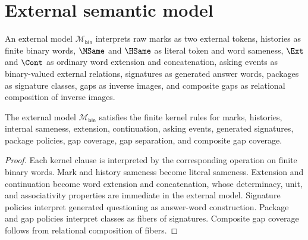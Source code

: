 \section{External semantic model}

\begin{definition}
\label{def:binary-external-model}
An external model \(\mathcal M_{\mathsf{bin}}\) interprets raw marks as two external tokens, histories as finite binary words, \(\MSame\) and \(\HSame\) as literal token and word sameness, \(\Ext\) and \(\Cont\) as ordinary word extension and concatenation, asking events as binary-valued external relations, signatures as generated answer words, packages as signature classes, gaps as inverse images, and composite gaps as relational composition of inverse images.
\end{definition}

\begin{theorem}
The external model \(\mathcal M_{\mathsf{bin}}\) satisfies the finite kernel rules for marks, histories, internal sameness, extension, continuation, asking events, generated signatures, package policies, gap coverage, gap separation, and composite gap coverage.
\end{theorem}
\begin{proof}
Each kernel clause is interpreted by the corresponding operation on finite binary words.  Mark and history sameness become literal sameness.  Extension and continuation become word extension and concatenation, whose determinacy, unit, and associativity properties are immediate in the external model.  Signature policies interpret generated questioning as answer-word construction.  Package and gap policies interpret classes as fibers of signatures.  Composite gap coverage follows from relational composition of fibers.
\end{proof}
